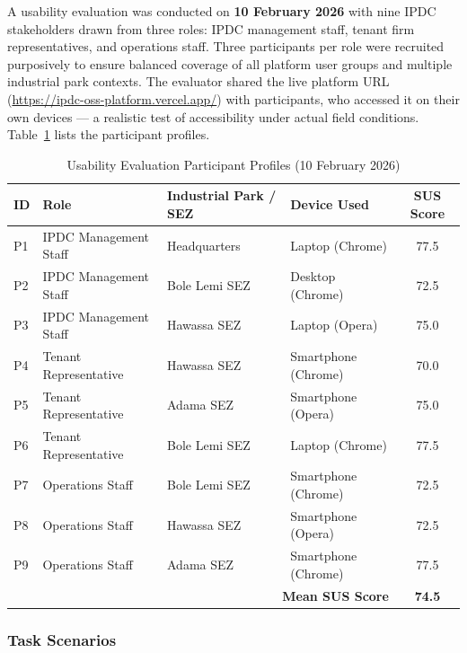 A usability evaluation was conducted on \textbf{10 February 2026} with nine IPDC stakeholders drawn from three roles: IPDC management staff, tenant firm representatives, and operations staff. Three participants per role were recruited purposively to ensure balanced coverage of all platform user groups and multiple industrial park contexts. The evaluator shared the live platform URL (\url{https://ipdc-oss-platform.vercel.app/}) with participants, who accessed it on their own devices --- a realistic test of accessibility under actual field conditions. Table~\ref{tab:sus-participants} lists the participant profiles.

\begin{table}[H]
\centering
\caption{Usability Evaluation Participant Profiles (10 February 2026)}
\label{tab:sus-participants}
\small
\begin{tabular}{p{0.6cm}p{3.5cm}p{3.5cm}p{2.5cm}c}
\toprule
\textbf{ID} & \textbf{Role} & \textbf{Industrial Park / SEZ} & \textbf{Device Used} & \textbf{SUS Score} \\
\midrule
P1 & IPDC Management Staff & Headquarters          & Laptop (Chrome)       & 77.5 \\
P2 & IPDC Management Staff & Bole Lemi SEZ         & Desktop (Chrome)      & 72.5 \\
P3 & IPDC Management Staff & Hawassa SEZ           & Laptop (Opera)        & 75.0 \\
P4 & Tenant Representative & Hawassa SEZ           & Smartphone (Chrome)   & 70.0 \\
P5 & Tenant Representative & Adama SEZ             & Smartphone (Opera)    & 75.0 \\
P6 & Tenant Representative & Bole Lemi SEZ         & Laptop (Chrome)       & 77.5 \\
P7 & Operations Staff      & Bole Lemi SEZ         & Smartphone (Chrome)   & 72.5 \\
P8 & Operations Staff      & Hawassa SEZ           & Smartphone (Opera)    & 72.5 \\
P9 & Operations Staff      & Adama SEZ             & Smartphone (Chrome)   & 77.5 \\
\midrule
\multicolumn{4}{r}{\textbf{Mean SUS Score}} & \textbf{74.5} \\
\bottomrule
\end{tabular}
\end{table}

\subsubsection{Task Scenarios}

